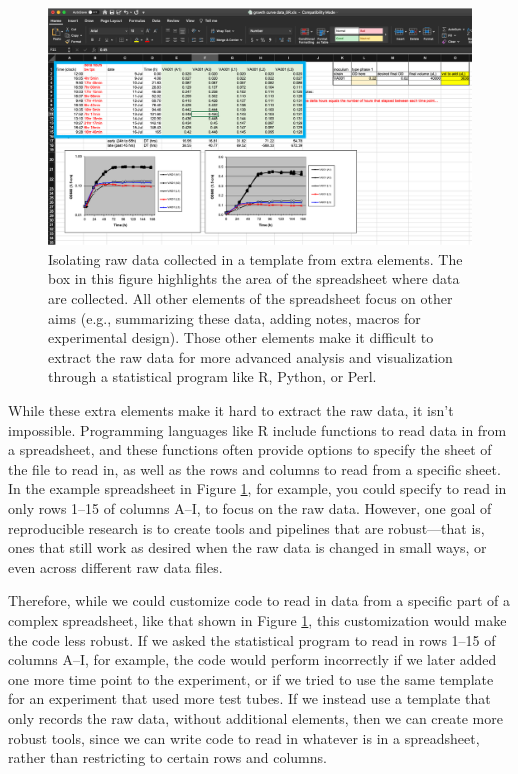 \documentclass[]{tufte-book}
\begin{document}
\begin{figure}
\includegraphics[width=\textwidth]{figures/growth_curve_raw_data} \caption[Isolating raw data collected in a template from extra elements]{Isolating raw data collected in a template from extra elements. The box in this figure highlights the area of the spreadsheet where data are collected. All other elements of the spreadsheet focus on other aims (e.g., summarizing these data, adding notes, macros for experimental design). Those other elements make it difficult to extract the raw data for more advanced analysis and visualization through a statistical program like R, Python, or Perl.}\label{fig:extractraw}
\end{figure}

While these extra elements make it hard to extract the raw data, it isn't
impossible. Programming languages like R include functions to read data in from
a spreadsheet, and these functions often provide options to specify the sheet of
the file to read in, as well as the rows and columns to read from a specific
sheet. In the example spreadsheet in Figure \ref{fig:extractraw}, for example,
you could specify to read in only rows 1--15 of columns A--I, to focus on the
raw data. However, one goal of reproducible research is to create tools and
pipelines that are robust---that is, ones that still work as desired when the
raw data is changed in small ways, or even across different raw data files.

Therefore, while we could customize code to read in data from a specific part of
a complex spreadsheet, like that shown in Figure \ref{fig:extractraw}, this
customization would make the code less robust. If we asked the statistical
program to read in rows 1--15 of columns A--I, for example, the code would
perform incorrectly if we later added one more time point to the experiment, or
if we tried to use the same template for an experiment that used more test
tubes. If we instead use a template that only records the raw data, without
additional elements, then we can create more robust tools, since we can write
code to read in whatever is in a spreadsheet, rather than restricting to certain
rows and columns.
\end{document}
